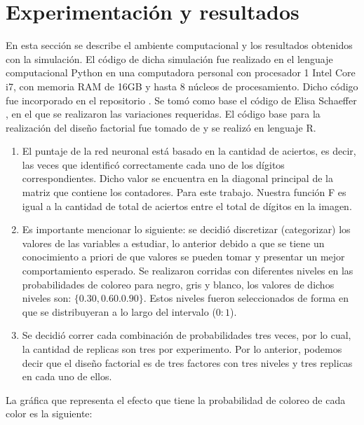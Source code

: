 \documentclass{article}
\begin{document}
	\section{Experimentación y resultados}
	En esta sección se describe el ambiente computacional y los resultados obtenidos con la simulación. El código de dicha simulación fue realizado en el lenguaje computacional Python en una computadora personal con procesador 1 Intel Core i7, con memoria RAM de 16GB y hasta 8 núcleos de procesamiento. Dicho código fue incorporado en el repositorio \cite{p_a}. Se tomó como base el código de Elisa Schaeffer \cite{pa}, en el que se realizaron las variaciones requeridas. El código base para la realización del diseño factorial fue tomado de \cite{pa2} y se realizó en lenguaje R.\\ 
    \begin{enumerate}
    \item El puntaje de la red neuronal está basado en la cantidad de aciertos, es decir, las veces que identificó correctamente cada uno de los dígitos correspondientes. Dicho valor se encuentra en la diagonal principal de la matriz que contiene los contadores. Para este trabajo. Nuestra función F es igual a la cantidad de total de aciertos entre el total de dígitos en la imagen.  
    \item Es importante mencionar lo siguiente: se decidió discretizar (categorizar) los valores de las variables a estudiar, lo anterior debido a que se tiene  un conocimiento a priori de que valores se pueden tomar y presentar un mejor comportamiento esperado. Se realizaron corridas con diferentes niveles en las probabilidades de coloreo para negro, gris y blanco, los valores de dichos niveles son: $\{ 0.30, 0.60. 0.90 \}$. Estos niveles fueron seleccionados de forma en que se distribuyeran a lo largo del intervalo ($0:1$).
    \item 	Se decidió correr cada combinación de probabilidades tres veces, por lo cual, la cantidad de replicas son tres por experimento.  Por lo anterior, podemos decir que el diseño factorial es de tres factores con tres niveles y tres replicas en cada uno de ellos.
    \end{enumerate}
	  
	La gráfica que representa el efecto que tiene la probabilidad de coloreo de cada color es la siguiente:  
	    	
\end{document}

